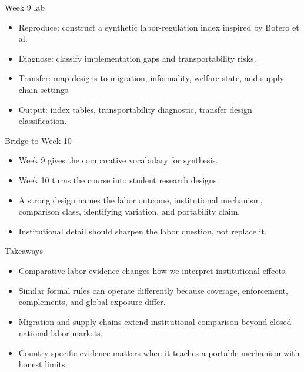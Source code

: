 \documentclass[aspectratio=169,11pt]{beamer}
\begin{document}
\begin{frame}{Week 9 lab}
\begin{itemize}
    \item Reproduce: construct a synthetic labor-regulation index inspired by Botero et al.
    \item Diagnose: classify implementation gaps and transportability risks.
    \item Transfer: map designs to migration, informality, welfare-state, and supply-chain settings.
    \item Output: index tables, transportability diagnostic, transfer design classification.
\end{itemize}
\end{frame}

\begin{frame}{Bridge to Week 10}
\begin{itemize}
    \item Week 9 gives the comparative vocabulary for synthesis.
    \item Week 10 turns the course into student research designs.
    \item A strong design names the labor outcome, institutional mechanism, comparison class, identifying variation, and portability claim.
    \item Institutional detail should sharpen the labor question, not replace it.
\end{itemize}
\end{frame}

\begin{frame}{Takeaways}
\begin{itemize}
    \item Comparative labor evidence changes how we interpret institutional effects.
    \item Similar formal rules can operate differently because coverage, enforcement, complements, and global exposure differ.
    \item Migration and supply chains extend institutional comparison beyond closed national labor markets.
    \item Country-specific evidence matters when it teaches a portable mechanism with honest limits.
\end{itemize}
\end{frame}
\end{document}
